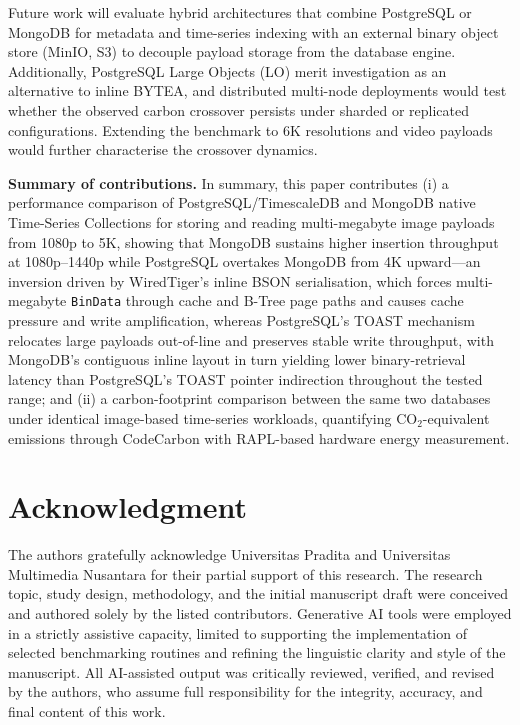 \documentclass[conference]{IEEEtran}
\begin{document}
Future work will evaluate hybrid architectures that combine PostgreSQL or MongoDB for metadata and time-series indexing with an external binary object store (MinIO, S3) to decouple payload storage from the database engine. Additionally, PostgreSQL Large Objects (LO) merit investigation as an alternative to inline BYTEA, and distributed multi-node deployments would test whether the observed carbon crossover persists under sharded or replicated configurations. Extending the benchmark to 6K resolutions and video payloads would further characterise the crossover dynamics.

\textbf{Summary of contributions.} In summary, this paper contributes (i) a performance comparison of PostgreSQL/TimescaleDB and MongoDB native Time-Series Collections for storing and reading multi-megabyte image payloads from 1080p to 5K, showing that MongoDB sustains higher insertion throughput at 1080p--1440p while PostgreSQL overtakes MongoDB from 4K upward---an inversion driven by WiredTiger's inline BSON serialisation, which forces multi-megabyte \texttt{BinData} through cache and B-Tree page paths and causes cache pressure and write amplification, whereas PostgreSQL's TOAST mechanism relocates large payloads out-of-line and preserves stable write throughput, with MongoDB's contiguous inline layout in turn yielding lower binary-retrieval latency than PostgreSQL's TOAST pointer indirection throughout the tested range; and (ii) a carbon-footprint comparison between the same two databases under identical image-based time-series workloads, quantifying CO$_2$-equivalent emissions through CodeCarbon with RAPL-based hardware energy measurement.


\section*{Acknowledgment}
The authors gratefully acknowledge Universitas Pradita and Universitas Multimedia Nusantara for their partial support of this research. The research topic, study design, methodology, and the initial manuscript draft were conceived and authored solely by the listed contributors. Generative AI tools were employed in a strictly assistive capacity, limited to supporting the implementation of selected benchmarking routines and refining the linguistic clarity and style of the manuscript. All AI-assisted output was critically reviewed, verified, and revised by the authors, who assume full responsibility for the integrity, accuracy, and final content of this work.




\end{document}
